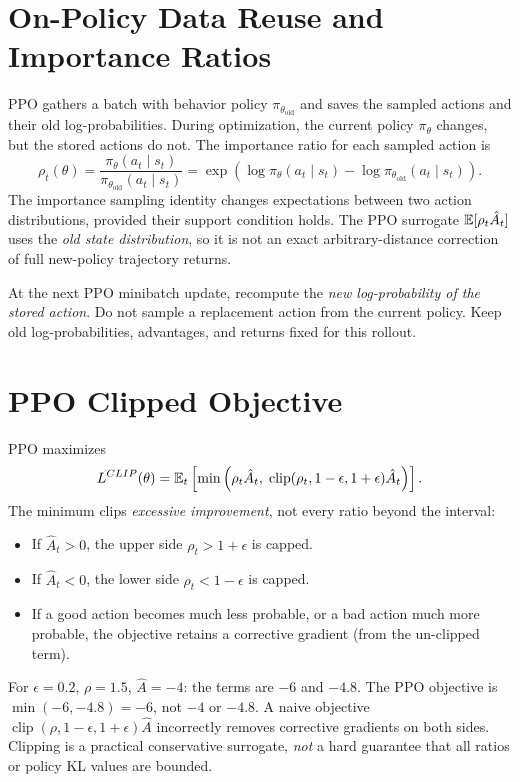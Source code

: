 \section{On-Policy Data Reuse and Importance Ratios}
PPO gathers a batch with behavior policy $\pi_{\theta_{\mathrm{old}}}$ and saves the sampled actions and their old log-probabilities. During optimization, the current policy $\pi_\theta$ changes, but the stored actions do not.
The importance ratio for each sampled action is
\begin{equation}
\rho_t(\theta)=\frac{\pi_\theta(a_t\mid s_t)}
{\pi_{\theta_{\mathrm{old}}}(a_t\mid s_t)}
=\exp(\log\pi_\theta(a_t\mid s_t)
-\log\pi_{\theta_{\mathrm{old}}}(a_t\mid s_t)).
\end{equation}
The importance sampling identity changes expectations between two action distributions, provided their support condition holds. The PPO surrogate $\mathbb{E}[\rho_t\hat A_t]$ uses the \emph{old state distribution}, so it is not an exact arbitrary-distance correction of full new-policy trajectory returns.
\begin{pitfall}
At the next PPO minibatch update, recompute the \emph{new log-probability of the stored action}. Do not sample a replacement action from the current policy. Keep old log-probabilities, advantages, and returns fixed for this rollout.
\end{pitfall}

\section{PPO Clipped Objective}
PPO maximizes
\begin{equation}
L^{CLIP}(\theta)=\mathbb{E}_t\left[
\min\left(
\rho_t\hat A_t,\;
\operatorname{clip}(\rho_t,1-\epsilon,1+\epsilon)\hat A_t
\right)\right].
\end{equation}
The minimum clips \emph{excessive improvement}, not every ratio beyond the interval:
\begin{itemize}
\item If $\hat A_t>0$, the upper side $\rho_t>1+\epsilon$ is capped.
\item If $\hat A_t<0$, the lower side $\rho_t<1-\epsilon$ is capped.
\item If a good action becomes much less probable, or a bad action much more probable, the objective retains a corrective gradient (from the un-clipped term).
\end{itemize}
For $\epsilon=0.2$, $\rho=1.5$, $\hat A=-4$: the terms are $-6$ and $-4.8$. The PPO objective is $\min(-6,-4.8)=-6$, not $-4$ or $-4.8$.
A naive objective $\operatorname{clip}(\rho,1-\epsilon,1+\epsilon)\hat A$ incorrectly removes corrective gradients on both sides.
Clipping is a practical conservative surrogate, \emph{not} a hard guarantee that all ratios or policy KL values are bounded.

